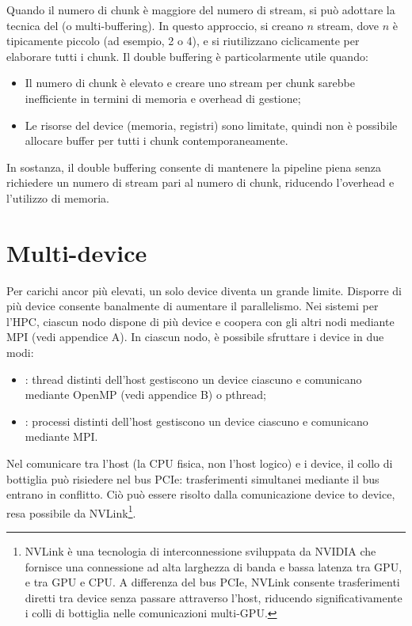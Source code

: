 Quando il numero di chunk è maggiore del numero di stream, si può adottare la tecnica del  (o multi-buffering). 
In questo approccio, si creano \(n\) stream, dove \(n\) è tipicamente piccolo (ad esempio, 2 o 4), e si riutilizzano ciclicamente per elaborare tutti i chunk.
Il double buffering è particolarmente utile quando:
\begin{itemize}
    \item Il numero di chunk è elevato e creare uno stream per chunk sarebbe inefficiente in termini di memoria e overhead di gestione;
    \item Le risorse del device (memoria, registri) sono limitate, quindi non è possibile allocare buffer per tutti i chunk contemporaneamente.
\end{itemize}
    
In sostanza, il double buffering consente di mantenere la pipeline piena senza richiedere un numero di stream pari al numero di chunk, riducendo l'overhead e l'utilizzo di memoria.

\section{Multi-device}
Per carichi ancor più elevati, un solo device diventa un grande limite. Disporre di più device consente banalmente di aumentare il parallelismo.
Nei sistemi per l'HPC, ciascun nodo dispone di più device e coopera con gli altri nodi mediante MPI (vedi appendice A).
In ciascun nodo, è possibile sfruttare i device in due modi:
\begin{itemize}
    \item {}: thread distinti dell'host gestiscono un device ciascuno e comunicano mediante OpenMP (vedi appendice B) o pthread;
    \item {}: processi distinti dell'host gestiscono un device ciascuno e comunicano mediante MPI.
\end{itemize}

Nel comunicare tra l'host (la CPU fisica, non l'host logico) e i device, il collo di bottiglia può risiedere nel bus PCIe: trasferimenti simultanei mediante il bus entrano in conflitto. Ciò può essere risolto dalla comunicazione device to device, resa possibile da NVLink\footnote{NVLink è una tecnologia di interconnessione sviluppata da NVIDIA che fornisce una connessione ad alta larghezza di banda e bassa latenza tra GPU, e tra GPU e CPU. A differenza del bus PCIe, NVLink consente trasferimenti diretti tra device senza passare attraverso l'host, riducendo significativamente i colli di bottiglia nelle comunicazioni multi-GPU.}.

